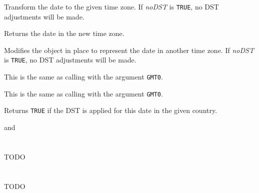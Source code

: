
Transform the date to the given time zone. If {\it noDST} is {\tt TRUE}, no
DST adjustments will be made.

Returns the date in the new time zone.

\label{wxdatetimemaketimezone}


Modifies the object in place to represent the date in another time zone. If
{\it noDST} is {\tt TRUE}, no DST adjustments will be made.

\label{wxdatetimetogmt}


This is the same as calling  with
the argument {\tt GMT0}.

\label{wxdatetimemakegmt}


This is the same as calling  with
the argument {\tt GMT0}.

\label{wxdatetimeisdst}


Returns {\tt TRUE} if the DST is applied for this date in the given country.


 and

\section{}\label{wxdatetimeholidayauthority}

TODO

\section{}\label{wxdatetimeworkdays}

TODO

